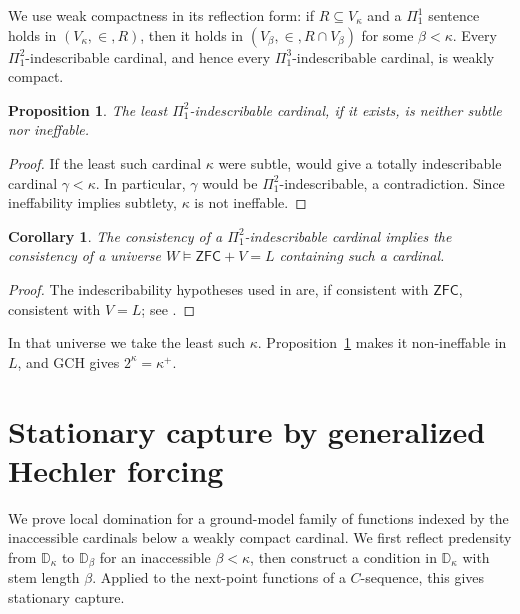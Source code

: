 \documentclass[11pt,a4paper]{amsart}
\newtheorem{proposition}[theorem]{Proposition}
\newtheorem{corollary}[theorem]{Corollary}
\theoremstyle{definition}
\theoremstyle{remark}
\newcommand{\D}{\mathbb D}
\newcommand{\ZFC}{\mathsf{ZFC}}
\begin{document}
We use weak compactness in its reflection form: if
\(R\subseteq V_\kappa\) and a \(\Pi^1_1\) sentence holds
in \((V_\kappa,\in,R)\), then it holds in
\((V_\beta,\in,R\cap V_\beta)\) for some \(\beta<\kappa\).
Every \(\Pi^2_1\)-indescribable cardinal, and hence every
\(\Pi^3_1\)-indescribable cardinal, is weakly compact.

\begin{proposition}\label{prop:least}
The least \(\Pi^2_1\)-indescribable cardinal, if it exists,
is neither subtle nor ineffable.
\end{proposition}
\begin{proof}
If the least such cardinal \(\kappa\) were subtle,
\cite[Lemma 5.4]{HLN} would give a totally indescribable
cardinal \(\gamma<\kappa\). In particular, \(\gamma\)
would be \(\Pi^2_1\)-indescribable, a contradiction.
Since ineffability implies subtlety, \(\kappa\) is not
ineffable.
\end{proof}

\begin{corollary}\label{cor:ground}
The consistency of a \(\Pi^2_1\)-indescribable cardinal
implies the consistency of a universe
\(W\models\ZFC+V=L\) containing such a cardinal.
\end{corollary}
\begin{proof}
The indescribability hypotheses used in \cite{Johnstone}
are, if consistent with \(\ZFC\), consistent with \(V=L\);
see \cite[Section 1, p.~1215]{Johnstone}.
\end{proof}

In that universe we take the least such \(\kappa\).
Proposition~\ref{prop:least} makes it non-ineffable in
\(L\), and GCH gives \(2^\kappa=\kappa^+\).

\section{Stationary capture by generalized Hechler forcing}
\label{sec:capture}

We prove local domination for a ground-model family of functions
indexed by the inaccessible cardinals below a weakly compact cardinal.
We first reflect predensity from \(\D_\kappa\) to \(\D_\beta\)
for an inaccessible \(\beta<\kappa\), then construct a condition
in \(\D_\kappa\) with stem length \(\beta\). Applied to the next-point
functions of a \(C\)-sequence,
this gives stationary capture.
\end{document}
